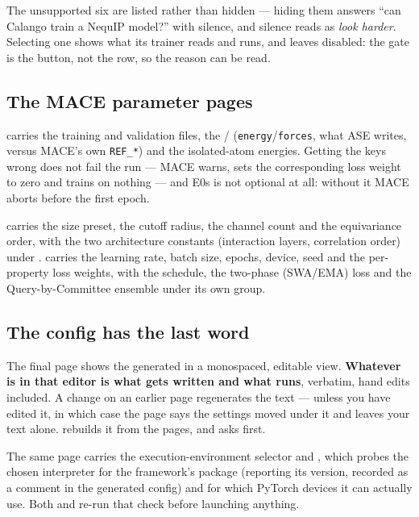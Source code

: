The unsupported six are listed rather than hidden --- hiding them answers
``can Calango train a NequIP model?'' with silence, and silence reads as
\emph{look harder}. Selecting one shows what its trainer reads and runs, and
leaves  disabled: the gate is the button, not the row, so the
reason can be read.

\subsection{The MACE parameter pages}

 carries the training and validation files, the
 /  (\texttt{energy}/\texttt{forces}, what
ASE writes, versus MACE's own \texttt{REF\_*}) and the isolated-atom
energies. Getting the keys wrong does not fail the run --- MACE warns, sets
the corresponding loss weight to zero and trains on nothing --- and E0s is
not optional at all: without it MACE aborts before the first epoch.

 carries the size preset, the cutoff radius, the channel count and
the equivariance order, with the two architecture constants (interaction
layers, correlation order) under .  carries the
learning rate, batch size, epochs, device, seed and the per-property loss
weights, with the schedule, the two-phase (SWA/EMA) loss and the
Query-by-Committee ensemble under its own  group.

\subsection{The config has the last word}

The final page shows the generated  in a monospaced,
editable view. \textbf{Whatever is in that editor is what gets written and
what runs}, verbatim, hand edits included. A change on an earlier page
regenerates the text --- unless you have edited it, in which case the page
says the settings moved under it and leaves your text alone.
 rebuilds it from the pages, and asks first.

The same page carries the execution-environment selector and
, which probes the chosen interpreter for the
framework's package (reporting its version, recorded as a comment in the
generated config) and for which PyTorch devices it can actually use. Both
 and  re-run that check before launching
anything.
